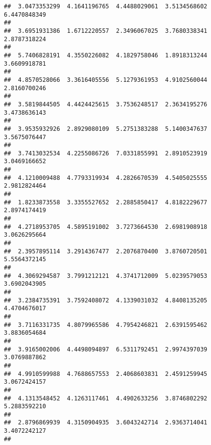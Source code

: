 \documentclass[]{article}
\begin{document}
\begin{verbatim}
##  3.0473353299  4.1641196765  4.4488029061  3.5134568602  6.4470848349 
##                                                                       
##  3.6951931386  1.6712220557  2.3496067025  3.7680338341  2.8787318224 
##                                                                       
##  5.7406828191  4.3550226082  4.1829758046  1.8918313244  3.6609918781 
##                                                                       
##  4.8570528066  3.3616405556  5.1279361953  4.9102560044  2.8160700246 
##                                                                       
##  3.5819844505  4.4424425615  3.7536248517  2.3634195276  3.4738636143 
##                                                                       
##  3.9535932926  2.8929080109  5.2751383288  5.1400347637  3.5675076447 
##                                                                       
##  3.7413032534  4.2255086726  7.0331855991  2.8910523919  3.0469166652 
##                                                                       
##  4.1210009488  4.7793319934  4.2826670539  4.5405025555  2.9812824464 
##                                                                       
##  1.8233873558  3.3355527652  2.2885850417  4.8182229677  2.8974174419 
##                                                                       
##  4.2718953705  4.5895191002  3.7273664530  2.6981908918  3.0626295664 
##                                                                       
##  2.3957895114  3.2914367477  2.2076870400  3.8760720501  5.5564372145 
##                                                                       
##  4.3069294587  3.7991212121  4.3741712009  5.0239579053  3.6902043905 
##                                                                       
##  3.2384735391  3.7592408072  4.1339031032  4.8408135205  4.4704676017 
##                                                                       
##  3.7116331735  4.8079965586  4.7954246821  2.6391595462  3.8836054684 
##                                                                       
##  3.9165002006  4.4498094897  6.5311792451  2.9974397039  3.0769887862 
##                                                                       
##  4.9910599988  4.7688657553  2.4068603831  2.4591259945  3.0672424157 
##                                                                       
##  4.1313548452  4.1263117461  4.4902633256  3.8746802292  5.2883592210 
##                                                                       
##  2.8796869939  4.3150904935  3.6043242714  2.9363714041  3.4072242127 
##                                                                       

\end{verbatim}
\end{document}
